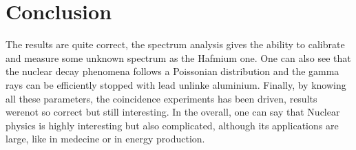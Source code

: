 \documentclass[a4paper,12pt,oneside]{article}
\begin{document}






\newpage
\section{Conclusion}
The results are quite correct, the spectrum analysis gives the ability to calibrate and measure some unknown spectrum as the Hafmium one. One can also see that the nuclear decay phenomena follows a Poissonian distribution and the gamma rays can be efficiently stopped with lead unlinke aluminium. Finally, by knowing all these parameters, the coincidence experiments has been driven, results werenot so correct but still interesting. In the overall, one can say that Nuclear physics is highly interesting but also complicated, although its applications are large, like in medecine or in energy production.




\end{document}
